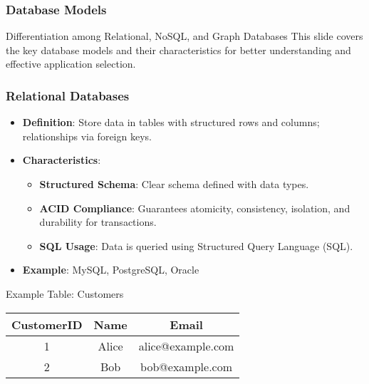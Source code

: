 \documentclass[aspectratio=169]{beamer}
\begin{document}
\begin{frame}
    \frametitle{Database Models}
    \begin{block}{Differentiation among Relational, NoSQL, and Graph Databases}
        This slide covers the key database models and their characteristics for better understanding and effective application selection.
    \end{block}
\end{frame}

\begin{frame}[fragile]
    \frametitle{Relational Databases}
    \begin{itemize}
        \item \textbf{Definition}: Store data in tables with structured rows and columns; relationships via foreign keys.
        \item \textbf{Characteristics}:
            \begin{itemize}
                \item \textbf{Structured Schema}: Clear schema defined with data types.
                \item \textbf{ACID Compliance}: Guarantees atomicity, consistency, isolation, and durability for transactions.
                \item \textbf{SQL Usage}: Data is queried using Structured Query Language (SQL).
            \end{itemize}
        \item \textbf{Example}: MySQL, PostgreSQL, Oracle
    \end{itemize}
    
    \begin{block}{Example Table: Customers}
        \begin{tabular}{|c|c|c|}
            \hline
            CustomerID & Name  & Email              \\
            \hline
            1          & Alice & alice@example.com   \\
            2          & Bob   & bob@example.com     \\
            \hline
        \end{tabular}
    \end{block}
\end{frame}
\end{document}
